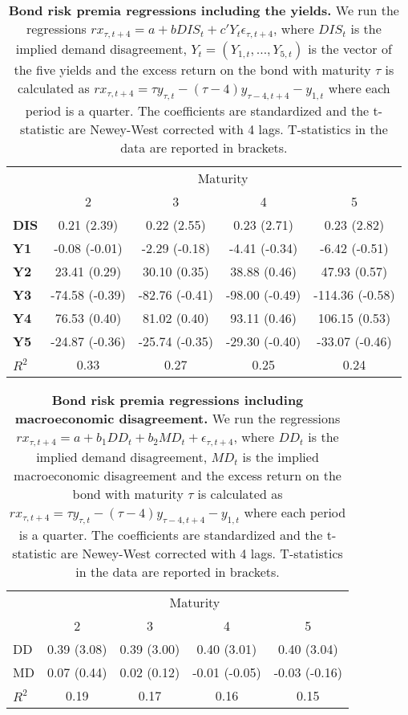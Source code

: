 \begin{table}[H]
\centering
\caption{\textbf{Bond risk premia regressions including the yields.} We run the regressions 
$rx_{\tau,t+4} = a + b DIS_t + c'Y_t \epsilon_{\tau,t+4}$, where $DIS_t$ is the implied demand disagreement, $Y_t=\left(Y_{1,t},\ldots,Y_{5,t}\right)$ is the vector of the five yields and the excess return on the bond with maturity $\tau$ is calculated as $rx_{\tau,t+4} = \tau y_{\tau,t} - \left(\tau-4\right)y_{\tau-4,t+4} - y_{1,t}$ where each period is a quarter. The coefficients are standardized and the t-statistic are Newey-West corrected with 4 lags. T-statistics in the data are reported in brackets.}
\begin{tabular}{lcccc}
\hline
\hline
& \multicolumn{4}{c}{Maturity} \\
& 2 & 3 & 4 & 5 \\
\hline
\textbf{DIS} & 0.21 (2.39) & 0.22 (2.55) & 0.23 (2.71) & 0.23 (2.82) \\
\textbf{Y1} & -0.08 (-0.01) & -2.29 (-0.18) & -4.41 (-0.34) & -6.42 (-0.51) \\
\textbf{Y2} & 23.41 (0.29) & 30.10 (0.35) & 38.88 (0.46) & 47.93 (0.57) \\
\textbf{Y3} & -74.58 (-0.39) & -82.76 (-0.41) & -98.00 (-0.49) & -114.36 (-0.58) \\
\textbf{Y4} & 76.53 (0.40) & 81.02 (0.40) & 93.11 (0.46) & 106.15 (0.53) \\
\textbf{Y5} & -24.87 (-0.36) & -25.74 (-0.35) & -29.30 (-0.40) & -33.07 (-0.46) \\
\hline
\textbf{$R^2$} & 0.33 & 0.27 & 0.25 & 0.24 \\
\hline
\hline
\end{tabular}
\label{table:rx2Dis_YLD}
\end{table}


\begin{table}[H]
\centering
\caption{\textbf{Bond risk premia regressions including macroeconomic disagreement.} We run the regressions 
$rx_{\tau,t+4} = a + b_1 DD_t + b_2 MD_t +  \epsilon_{\tau,t+4}$, where $DD_t$ is the implied demand disagreement, $MD_t$ is the implied macroeconomic disagreement and the excess return on the bond with maturity $\tau$ is calculated as $rx_{\tau,t+4} = \tau y_{\tau,t} - \left(\tau-4\right)y_{\tau-4,t+4} - y_{1,t}$ where each period is a quarter. The coefficients are standardized and the t-statistic are Newey-West corrected with 4 lags. T-statistics in the data are reported in brackets.}
\begin{tabular}{lcccc}
\hline
\hline
& \multicolumn{4}{c}{Maturity} \\
 &  2 & 3 &  4 & 5 \\
\hline
DD       & 0.39 (3.08) & 0.39 (3.00) & 0.40 (3.01) & 0.40 (3.04) \\
MD  & 0.07 (0.44) & 0.02 (0.12) & -0.01 (-0.05) & -0.03 (-0.16) \\
$R^2$          & 0.19        & 0.17        & 0.16        & 0.15        \\
\hline
\end{tabular}
\label{table:rx2DisMD}
\end{table}


